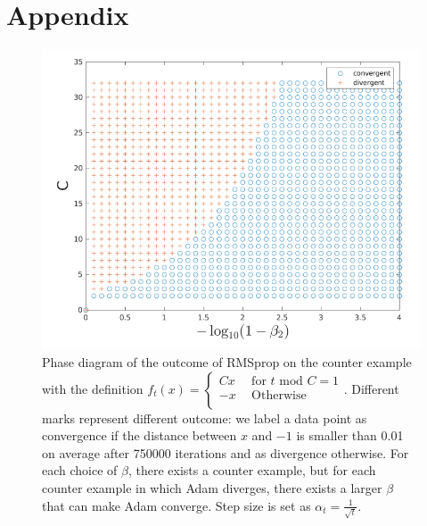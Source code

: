 \documentclass{article}
\begin{document}
%
\newpage
\section*{Appendix}
\begin{figure}[h]
\label{fig1}
\centering
\includegraphics[scale = 0.5]{rmsp.png}
\caption{Phase diagram of the outcome of RMSprop on the counter example with the definition
			\(f_t(x) =
	\begin{cases}
		Cx & \ \ \text{for $t$ mod $C = 1$}\\
		-x & \ \ \text{Otherwise}\\
	\end{cases}
	\). 
	Different marks represent
	different outcome: we label a data point as convergence if the distance between $x$ and $-1$ is smaller than 0.01
	on average after 750000 iterations and as divergence otherwise. For each choice of $\beta$, there exists a counter
	example, but for each counter example in which Adam diverges, there exists a larger $\beta$ that can make Adam
	converge. Step size is set as $\alpha_t = \frac{1}{\sqrt{t}}$.}
\end{figure}
\end{document}
